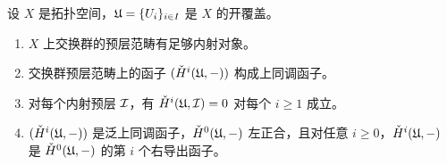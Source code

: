 \begin{proposition}\label{it:2.3.3}
设 $X$ 是拓扑空间，$\mathfrak{U}=\{U_i\}_{i\in I}$ 是 $X$ 的开覆盖。
\begin{enumerate}[label=(\roman*),leftmargin=2.8em]
  \item $X$ 上交换群的预层范畴有足够内射对象。
  \item 交换群预层范畴上的函子 $(\check{H}^i(\mathfrak{U},-))$ 构成上同调函子。
  \item 对每个内射预层 $\mathcal{I}$，有 $\check{H}^i(\mathfrak{U},\mathcal{I})=0$ 对每个 $i\ge 1$ 成立。
  \item $(\check{H}^i(\mathfrak{U},-))$ 是泛上同调函子，$\check{H}^0(\mathfrak{U},-)$ 左正合，且对任意 $i\ge 0$，$\check{H}^i(\mathfrak{U},-)$ 是 $\check{H}^0(\mathfrak{U},-)$ 的第 $i$ 个右导出函子。
\end{enumerate}
\end{proposition}

